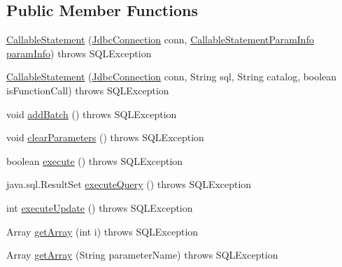 \subsection*{Public Member Functions}
\begin{DoxyCompactItemize}
\item 
\mbox{\hyperlink{classcom_1_1mysql_1_1cj_1_1jdbc_1_1_callable_statement_aedac79a513af12d5af9a38c06593ae77}{Callable\+Statement}} (\mbox{\hyperlink{interfacecom_1_1mysql_1_1cj_1_1jdbc_1_1_jdbc_connection}{Jdbc\+Connection}} conn, \mbox{\hyperlink{classcom_1_1mysql_1_1cj_1_1jdbc_1_1_callable_statement_1_1_callable_statement_param_info}{Callable\+Statement\+Param\+Info}} \mbox{\hyperlink{classcom_1_1mysql_1_1cj_1_1jdbc_1_1_callable_statement_a9b918f6fd2f0ff28fc6b3c8560d9a59b}{param\+Info}})  throws S\+Q\+L\+Exception 
\item 
\mbox{\hyperlink{classcom_1_1mysql_1_1cj_1_1jdbc_1_1_callable_statement_a87cbed70a05b60f543557c5158d65520}{Callable\+Statement}} (\mbox{\hyperlink{interfacecom_1_1mysql_1_1cj_1_1jdbc_1_1_jdbc_connection}{Jdbc\+Connection}} conn, String sql, String catalog, boolean is\+Function\+Call)  throws S\+Q\+L\+Exception 
\item 
void \mbox{\hyperlink{classcom_1_1mysql_1_1cj_1_1jdbc_1_1_callable_statement_ae000145f4789826611e9e31158063446}{add\+Batch}} ()  throws S\+Q\+L\+Exception 
\item 
void \mbox{\hyperlink{classcom_1_1mysql_1_1cj_1_1jdbc_1_1_callable_statement_afaafbaefee9ef17b104a40041ff17fac}{clear\+Parameters}} ()  throws S\+Q\+L\+Exception 
\item 
boolean \mbox{\hyperlink{classcom_1_1mysql_1_1cj_1_1jdbc_1_1_callable_statement_aaa92dc9c08a10d95a69bfc5736f041a7}{execute}} ()  throws S\+Q\+L\+Exception 
\item 
java.\+sql.\+Result\+Set \mbox{\hyperlink{classcom_1_1mysql_1_1cj_1_1jdbc_1_1_callable_statement_acb22796d45316e71fdb37c36865a954f}{execute\+Query}} ()  throws S\+Q\+L\+Exception 
\item 
int \mbox{\hyperlink{classcom_1_1mysql_1_1cj_1_1jdbc_1_1_callable_statement_a2410d77057db5d681e4a80c74adfa1c2}{execute\+Update}} ()  throws S\+Q\+L\+Exception 
\item 
Array \mbox{\hyperlink{classcom_1_1mysql_1_1cj_1_1jdbc_1_1_callable_statement_abbdda7be3e842e71327e8ea392f7a5ed}{get\+Array}} (int i)  throws S\+Q\+L\+Exception 
\item 
Array \mbox{\hyperlink{classcom_1_1mysql_1_1cj_1_1jdbc_1_1_callable_statement_a188c215d455bd103ff1df71a20edea16}{get\+Array}} (String parameter\+Name)  throws S\+Q\+L\+Exception 

\end{DoxyCompactItemize}

